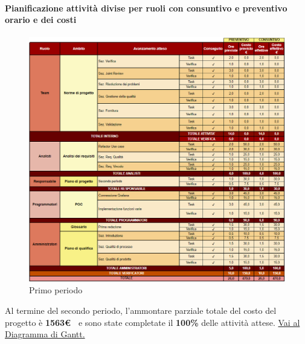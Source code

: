 \newpage
\paragraph{Pianificazione attività divise per ruoli con consuntivo e preventivo orario e dei costi}\hspace{1pt}

\begin{figure}[H]
    \centering
    \includegraphics[height=1.0\textwidth]{../Images/periodo2.PNG}
    \caption{Primo periodo}
    \label{fig:1periodo}
\end{figure}

Al termine del secondo periodo, l'ammontare parziale totale del costo del progetto è \textbf{ 1563\euro\ } e sono state completate il \textbf{100\%} delle attività attese.
\href{https://github.com/orgs/ByteOps-swe/projects/3/views/1?sortedBy%5Bdirection%5D=asc&sortedBy%5BcolumnId%5D=64182560}{Vai al Diagramma di Gantt.}


